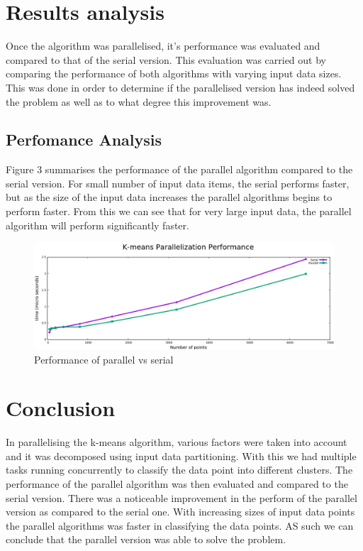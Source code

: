 \documentclass[12pt]{article}
\begin{document}
  	\section{Results analysis}
    	\begin{flushleft}
			Once the algorithm was parallelised, it’s performance was evaluated and compared to that of the serial version. This evaluation was carried out by comparing the performance of both algorithms with varying input data sizes. This was done in order to determine if the parallelised version has indeed solved the problem as well as to what degree this improvement was.
    	\end{flushleft}
    	
    	\subsection{Perfomance Analysis}
    		\begin{flushleft}
    			Figure 3 summarises the performance of the parallel algorithm compared to the serial version. For small number of input data items, the serial performs faster, but as the size of the input data increases the parallel algorithms begins to perform faster. From this we can see that for very large input data, the parallel algorithm will perform significantly faster.
    		\end{flushleft}
    		
    		\begin{figure}
    			\begin{center}
    				\includegraphics[scale=0.4]{performance.png}
    			\end{center}
    			\caption{Performance of parallel vs serial}
    		\end{figure}
    	
	\section{Conclusion}
    	\begin{flushleft}
			In parallelising the k-means algorithm, various factors were taken into account and it was decomposed using input data partitioning. With this we had multiple tasks running concurrently to classify the data point into different clusters. The performance of the parallel algorithm was then evaluated and compared to the serial version. There was a noticeable improvement in the perform of the parallel version as compared to the serial one. With increasing sizes of input data points the parallel algorithms was faster in classifying the data points. AS such we can conclude that the parallel version was able to solve the problem.
    	\end{flushleft}
\end{document}

